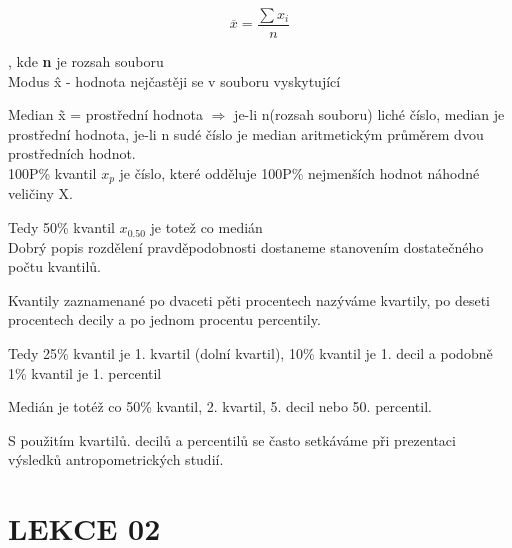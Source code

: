 \documentclass[a4paper,12pt]{article}
\begin{document}
\[
	\overline{x} = \frac{\sum x_{i}}{n}
\]

, kde \textbf{n} je rozsah souboru \\

Modus \^{x} - hodnota nejčastěji se v souboru vyskytující

Median \~{x} = prostřední hodnota  $\Rightarrow$ je-li n(rozsah souboru) 
liché číslo, median je prostřední hodnota, je-li n sudé číslo
je median aritmetickým průměrem dvou prostředních hodnot. \\

100P\% kvantil $x_{p}$ je číslo, které odděluje 100P\% nejmenších hodnot
náhodné veličiny X.

Tedy 50\% kvantil $x_{0.50}$ je totež co medián \\

Dobrý popis rozdělení pravděpodobnosti dostaneme stanovením dostatečného počtu kvantilů.

Kvantily zaznamenané po dvaceti pěti procentech nazýváme kvartily,
po deseti procentech decily a po jednom procentu percentily.

Tedy 25\% kvantil je 1. kvartil (dolní kvartil), 10\% kvantil je 1. decil a podobně 1\% 
kvantil je 1. percentil

Medián je totéž co 50\% kvantil, 2. kvartil, 5. decil nebo 50. percentil.

S použitím kvartilů. decilů a percentilů se často setkáváme při prezentaci výsledků
antropometrických studií.
 
\newpage
\section{LEKCE 02}
\end{document}
